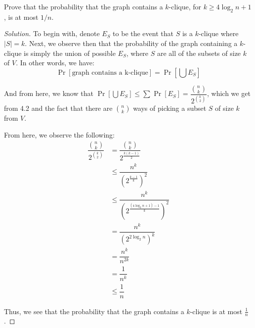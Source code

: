 \documentclass{article}
\newenvironment{solution}{\begin{proof}[Solution]}{\end{proof}}
\let\oldsum\sum
\renewcommand{\sum}[2]{\oldsum\limits_{#1}^{#2}}
\begin{document}
\begin{hw}
	Prove that the probability that the graph contains a $k$-clique, for $k \geq 4{\log_2 n}+1$, is at most $1/n$.
\end{hw}
\begin{solution}
	To begin with, denote $E_{S}$ to be the event that $S$ is a $k$-clique where $\lvert S \rvert = k$. Next, we observe then that the probability of the graph containing a $k$-clique is simply the union of possible $E_{S}$, where $S$ are all of the subsets of size $k$ of $V$. In other words, we have:
	\begin{equation*}
		\Pr[\text{graph contains a k-clique}] = \Pr\left[ \bigcup E_{S} \right]
	\end{equation*}

	And from here, we know that $\Pr\left[ \bigcup E_{S} \right] \leq \sum{}{} \Pr[E_{S}] = \dfrac{\binom{n}{k}}{2^{\binom{k}{2}}}$, which we get from 4.2 and the fact that there are $\binom{n}{k}$ ways of picking a subset $S$ of size $k$ from $V$.
	
	From here, we observe the following:
	\begin{align*}
		\dfrac{\binom{n}{k}}{2^{\binom{k}{2}}} &= \dfrac{\binom{n}{k}}{2^{\frac{k(k-1)}{2}}} \\
		&\leq \dfrac{n^{k}}{\left( 2^{\frac{k-1}{k}} \right)^{2}} \tag*{by inequality in 4.4}\\
		&\leq \dfrac{n^{k}}{\left( 2^{\frac{(4\log_2 n + 1) -1}{k}} \right)^{2}} \tag*{substitute in $4\log_2 n + 1$ for $k$} \\
		&= \dfrac{n^{k}}{\left( 2^{2\log_{2} n} \right)^{k}} \\
		&= \dfrac{n^{k}}{n^{2k}} \\
		&= \dfrac{1}{n^{k}} \\
		&\leq \dfrac{1}{n}
	\end{align*}

	Thus, we see that the probability that the graph contains a $k$-clique is at most $\frac{1}{n}$.
\end{solution}

\newpage
\end{document}
